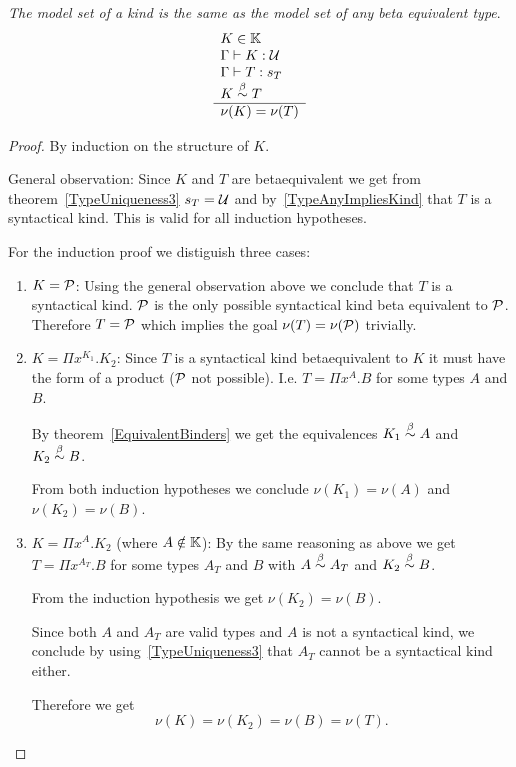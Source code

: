 \begin{lemma}
    \label{ModelEquivalentKinds}
    \emph{The model set of a kind is the same as the model set of any beta
    equivalent type}.
    $$
    \begin{array}{l} 
        K \in \mathbb{K}
        \\
        \Gamma \vdash K: {\cal U}
        \\
        \Gamma \vdash T: s_T
        \\
        K \stackrel{\beta}{\sim} T
     \\ \hline 
        \nu(K) = \nu(T)
    \end{array}
    $$

    \begin{proof}
        By induction on the structure of $K$.

        General observation: Since $K$ and $T$ are betaequivalent we get from
        theorem~\ref{TypeUniqueness3} $s_T = {\cal U}$ and
        by~\ref{TypeAnyImpliesKind} that $T$ is a syntactical kind. This is
        valid for all induction hypotheses.

        For the induction proof we distiguish three cases:
        \begin{enumerate}
        \item $K = {\cal P}$: Using the general observation above we conclude that
            $T$ is a syntactical kind. ${\cal P}$ is the only possible syntactical
                kind beta equivalent to ${\cal P}$. Therefore $T = {\cal P}$ which
                implies the goal $\nu(T) = \nu({\cal P})$ trivially.

        \item $K = \Pi x^{K_1}. K_2$:
            Since $T$ is a syntactical kind betaequivalent to $K$ it must have
                the form of a product (${\cal P}$ not possible). I.e. $T = \Pi
                x^A.B$ for some types $A$ and $B$.

            By theorem~\ref{EquivalentBinders} we get the equivalences $K_1
                \stackrel{\beta}{\sim} A$ and $K_2 \stackrel{\beta}{\sim} B$.

            From both induction hypotheses we conclude $\nu(K_1) = \nu(A)$ and
            $\nu(K_2) = \nu(B)$.


        \item $K = \Pi x^A . K_2$ (where $A \notin \mathbb{K}$):
            By the same reasoning as above we get $T = \Pi x^{A_T}.B$ for some
            types $A_T$ and $B$ with $A \stackrel{\beta}{\sim} A_T$ and $ K_2 \stackrel{\beta}{\sim} B$.

                From the induction hypothesis we get $\nu(K_2) = \nu(B)$.

            Since both $A$ and $A_T$ are valid types and $A$ is not a
                syntactical kind, we conclude by using~\ref{TypeUniqueness3}
                that $A_T$ cannot be a syntactical kind either.

            Therefore we get
            $$
                \nu(K) = \nu(K_2) = \nu(B) = \nu(T).
            $$
        \end{enumerate}
    \end{proof}
\end{lemma}


